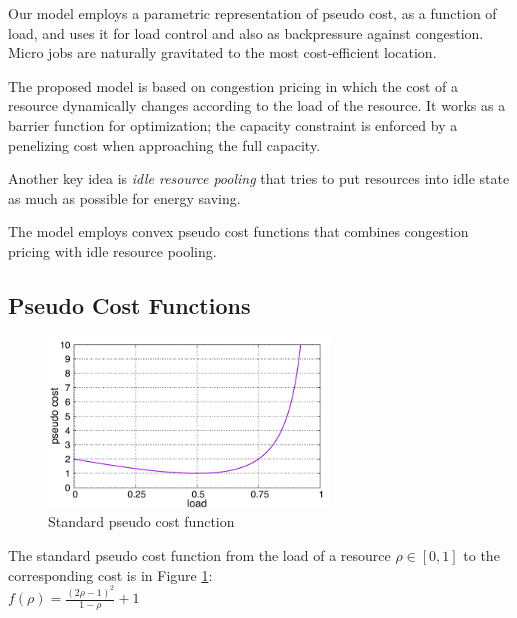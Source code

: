 

Our model employs a parametric representation of pseudo cost, as a
function of load, and uses it for load control and also as
backpressure against congestion.
Micro jobs are naturally gravitated to the most cost-efficient
location.

The proposed model is based on congestion pricing in which the cost of
a resource dynamically changes according to the load of the resource.
It works as a barrier function for optimization; the capacity
constraint is enforced by a penelizing cost when approaching the full
capacity.

Another key idea is {\em idle resource pooling} that tries to put resources
into idle state as much as possible for energy saving.

The model employs convex pseudo cost functions that combines congestion
pricing with idle resource pooling.

\subsection{Pseudo Cost Functions}

\begin{figure}[thb]
  \begin{center}
    \includegraphics[width=7.5cm,clip]{costfunc.pdf}
    \vspace{-2.0ex}
    \caption{Standard pseudo cost function}
    \label{fig:std_costfunc}
  \end{center}
\end{figure}

The standard pseudo cost function from the load of a resource
$\rho \in [0, 1]$ to the corresponding cost is in Figure
\ref{fig:std_costfunc}: \\

\( f(\rho) = \frac{(2\rho - 1)^{2}}{1 - \rho} + 1  \) \\

